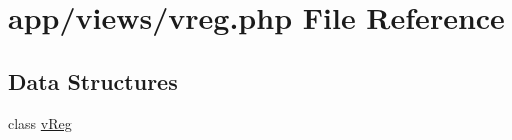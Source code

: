 \hypertarget{vreg_8php}{}\section{app/views/vreg.php File Reference}
\label{vreg_8php}
\subsection*{Data Structures}
\begin{DoxyCompactItemize}
\item 
class \hyperlink{classvReg}{v\+Reg}
\end{DoxyCompactItemize}
